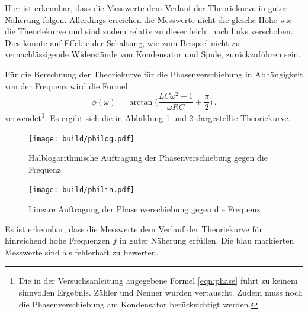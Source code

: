 Hier ist erkennbar, dass die Messwerte dem Verlauf der Theoriekurve in guter
Näherung folgen. Allerdings erreichen die Messwerte nicht die gleiche Höhe wie
die Theoriekurve und sind zudem relativ zu dieser leicht nach links verschoben.
Dies könnte auf Effekte der Schaltung, wie zum Beispiel nicht zu vernachlässigende
Widerstände von Kondensator und Spule, zurückzuführen sein.


Für die Berechnung der Theoriekurve für die Phasenverschiebung in Abhängigkeit
von der Frequenz wird die Formel
\begin{equation}
  \phi(\omega)=\arctan\biggl(\frac{L C \omega^2-1}{\omega R C}+\frac{\pi}{2}\biggr)\,.
\end{equation}
verwendet\footnote{Die in der Versuchsanleitung angegebene Formel \eqref{eqn:phase}
führt zu keinem sinnvollen Ergebnis. Zähler und Nenner wurden
vertauscht. Zudem muss noch die Phasenverschiebung am Kondensator berücksichtigt
werden.}.
Es ergibt sich die in Abbildung \ref{fig:philog2} und \ref{fig:philin2}
dargestellte Theoriekurve.


\begin{figure}
  \centering
  \texttt{[image: build/philog.pdf]}
  \caption{Halblogarithmische Auftragung der Phasenverschiebung gegen die Frequenz}
  \label{fig:philog2}
\end{figure}

\begin{figure}
  \centering
  \texttt{[image: build/philin.pdf]}
  \caption{Lineare Auftragung der Phasenverschiebung gegen die Frequenz}
  \label{fig:philin2}
\end{figure}

Es ist erkennbar, dass die Messwerte dem Verlauf der Theoriekurve für hinreichend
hohe Frequenzen $f$ in guter Näherung erfüllen. Die blau markierten Messwerte
sind als fehlerhaft zu bewerten.
